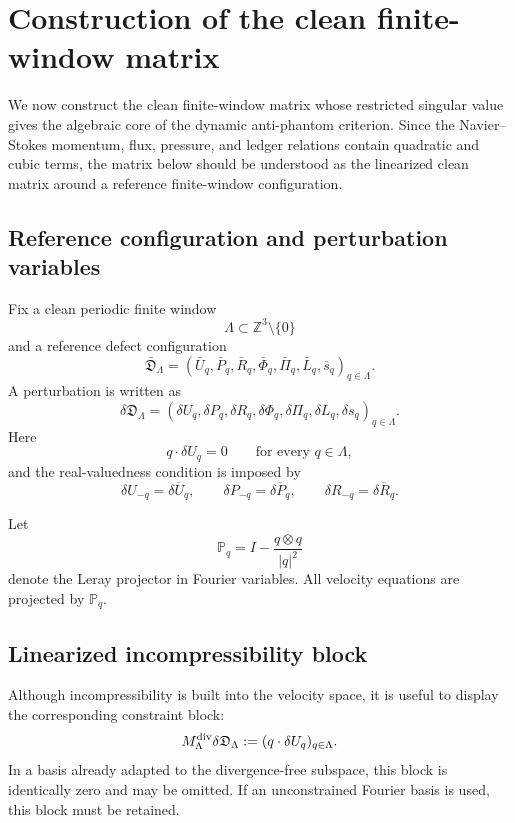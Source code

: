 \documentclass[11pt]{article}
\numberwithin{equation}{section}
\begin{document}
\section{Construction of the clean finite-window matrix}\label{sec:clean-finite-window-matrix}

We now construct the clean finite-window matrix whose restricted singular
value gives the algebraic core of the dynamic anti-phantom criterion.  Since
the Navier--Stokes momentum, flux, pressure, and ledger relations contain
quadratic and cubic terms, the matrix below should be understood as the
linearized clean matrix around a reference finite-window configuration.

\subsection{Reference configuration and perturbation variables}

Fix a clean periodic finite window
\[
        \Lambda\subset \mathbb Z^3\setminus\{0\}
\]
and a reference defect configuration
\[
        \bar{\mathfrak D}_\Lambda
        =
        (\bar U_q,\bar P_q,\bar R_q,\bar \Phi_q,\bar \Pi_q,
        \bar L_q,\bar s_q)_{q\in\Lambda}.
\]
A perturbation is written as
\[
        \delta\mathfrak D_\Lambda
        =
        (\delta U_q,\delta P_q,\delta R_q,\delta \Phi_q,\delta \Pi_q,
        \delta L_q,\delta s_q)_{q\in\Lambda}.
\]
Here
\[
        q\cdot \delta U_q=0
        \qquad \text{for every }q\in\Lambda,
\]
and the real-valuedness condition is imposed by
\[
        \delta U_{-q}=\overline{\delta U_q},
        \qquad
        \delta P_{-q}=\overline{\delta P_q},
        \qquad
        \delta R_{-q}=\overline{\delta R_q}.
\]

Let
\[
        \mathbb P_q
        =
        I-\frac{q\otimes q}{|q|^2}
\]
denote the Leray projector in Fourier variables.  All velocity equations
are projected by \(\mathbb P_q\).

\subsection{Linearized incompressibility block}

Although incompressibility is built into the velocity space, it is useful
to display the corresponding constraint block:
\[
        M_\Lambda^{\rm div}\delta\mathfrak D_\Lambda
        :=
        (q\cdot \delta U_q)_{q\in\Lambda}.
\]
In a basis already adapted to the divergence-free subspace, this block is
identically zero and may be omitted.  If an unconstrained Fourier basis is
used, this block must be retained.
\end{document}
